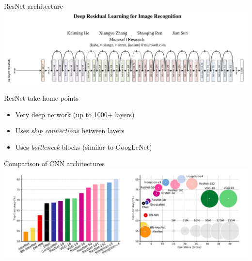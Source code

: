 \documentclass[9pt, aspectratio=169]{beamer}
\begin{document}
\begin{frame}
    {ResNet architecture}
    \centering
    \includegraphics[width=\textwidth]{resnet.png}
\end{frame}

\begin{frame}
    {ResNet take home points}
    \begin{itemize}
        \item Very deep network (up to 1000+ layers)
        \item Uses \textit{skip connections} between layers 
        \item Uses \textit{bottleneck} blocks (similar to GoogLeNet)
    \end{itemize}
\end{frame}

\begin{frame}
    {Comparison of CNN architectures}
    \centering
    \includegraphics[width=\textwidth]{comparison.png}
\end{frame}
\end{document}
